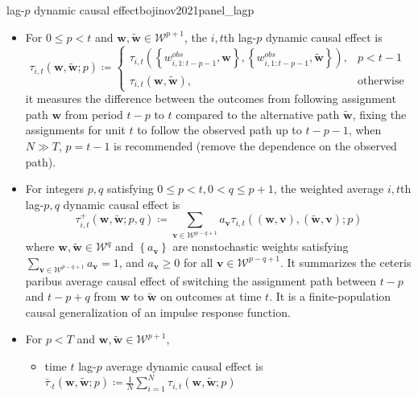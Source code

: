 \documentclass[twoside]{article}
\begin{document}
\begin{definition}{lag-$p$ dynamic causal effect}{bojinov2021panel_lagp}
    \begin{itemize}
        \item For $0\leq p <t$ and $\mathbf{w},\tilde{\mathbf{w}}\in\mathcal{W}^{p+1}$, the $i,t$th lag-$p$ dynamic causal effect is 
        \begin{equation*}
            \tau_{i,t}\left(\mathbf{w},\tilde{\mathbf{w}};p\right) \coloneq \begin{cases}
                \tau_{i,t}\left( \left\{w^{obs}_{i,1:t-p-1},\mathbf{w}\right\}, \left\{w^{obs}_{i,1:t-p-1},\tilde{\mathbf{w}}\right\} \right), & p<t-1\\
                \tau_{i,t}\left(\mathbf{w},\tilde{\mathbf{w}}\right), & \text{otherwise}
            \end{cases}
        \end{equation*}
        it measures the difference between the outcomes from following assignment path $\mathbf{w}$ from period $t-p$ to $t$ compared to the alternative path $\tilde{\mathbf{w}}$, fixing the assignments for unit $t$ to follow the observed path up to $t-p-1$, when $N\gg T$, $p=t-1$ is recommended (remove the dependence on the observed path).
        \item For integers $p,q$ satisfying $0\leq p <t,0<q\leq p+1$, the weighted average $i,t$th lag-$p,q$ dynamic causal effect is
        $$ \tau_{i,t}^+\left(\mathbf{w},\tilde{\mathbf{w}};p,q\right) \coloneq \sum_{\mathbf{v}\in \mathcal{W}^{p-q+1}} a_{\mathbf{v}} \tau_{i,t}\left((\mathbf{w},\mathbf{v}),(\tilde{\mathbf{w}},\mathbf{v}); p \right) $$
        where $\mathbf{w},\tilde{\mathbf{w}}\in \mathcal{W}^q$ and $\left\{a_{\mathbf{v}}\right\}$ are nonstochastic weights satisfying $\sum_{\mathbf{v}\in \mathcal{W}^{p-q+1}} a_{\mathbf{v}}=1$, and $a_{\mathbf{v}}\geq 0$ for all $\mathbf{v}\in\mathcal{W}^{p-q+1}$. It summarizes the ceteris paribus average causal effect of switching the assignment path between $t-p$ and $t-p+q$ from $\mathbf{w}$ to $\tilde{\mathbf{w}}$ on outcomes at time $t$. It is a finite-population causal generalization of an impulse response function.
        \item For $p<T$ and $\mathbf{w},\tilde{\mathbf{w}}\in \mathcal{W}^{p+1}$, 
        \begin{itemize}
            \item time $t$ lag-$p$ average dynamic causal effect is $\bar{\tau}_{\cdot t}\left(\mathbf{w},\tilde{\mathbf{w}};p\right) \coloneq \frac{1}{N}\sum^N_{i=1}\tau_{i,t}\left(\mathbf{w},\tilde{\mathbf{w}};p\right)$

\end{itemize}
\end{itemize}
\end{definition}
\end{document}
